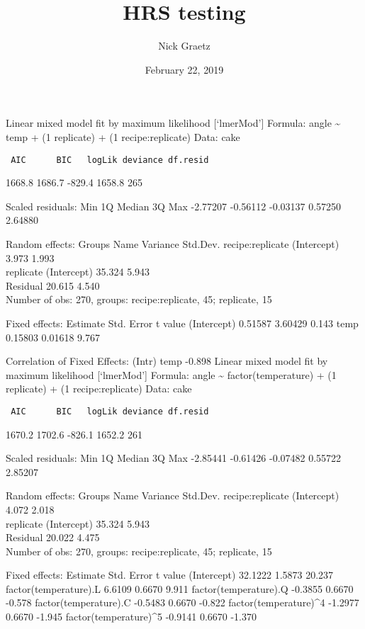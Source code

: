 \documentclass[]{article}
\title{HRS testing}
\author{Nick Graetz}
\date{February 22, 2019}
\begin{document}
\maketitle

\small
Linear mixed model fit by maximum likelihood {[}`lmerMod'{]} Formula:
angle \textasciitilde{} temp + (1 \textbar{} replicate) + (1 \textbar{}
recipe:replicate) Data: cake

\begin{verbatim}
 AIC      BIC   logLik deviance df.resid 
\end{verbatim}

1668.8 1686.7 -829.4 1658.8 265

Scaled residuals: Min 1Q Median 3Q Max -2.77207 -0.56112 -0.03137
0.57250 2.64880

Random effects: Groups Name Variance Std.Dev. recipe:replicate
(Intercept) 3.973 1.993\\
replicate (Intercept) 35.324 5.943\\
Residual 20.615 4.540\\
Number of obs: 270, groups: recipe:replicate, 45; replicate, 15

Fixed effects: Estimate Std. Error t value (Intercept) 0.51587 3.60429
0.143 temp 0.15803 0.01618 9.767

Correlation of Fixed Effects: (Intr) temp -0.898 Linear mixed model fit
by maximum likelihood {[}`lmerMod'{]} Formula: angle \textasciitilde{}
factor(temperature) + (1 \textbar{} replicate) + (1 \textbar{}
recipe:replicate) Data: cake

\begin{verbatim}
 AIC      BIC   logLik deviance df.resid 
\end{verbatim}

1670.2 1702.6 -826.1 1652.2 261

Scaled residuals: Min 1Q Median 3Q Max -2.85441 -0.61426 -0.07482
0.55722 2.85207

Random effects: Groups Name Variance Std.Dev. recipe:replicate
(Intercept) 4.072 2.018\\
replicate (Intercept) 35.324 5.943\\
Residual 20.022 4.475\\
Number of obs: 270, groups: recipe:replicate, 45; replicate, 15

Fixed effects: Estimate Std. Error t value (Intercept) 32.1222 1.5873
20.237 factor(temperature).L 6.6109 0.6670 9.911 factor(temperature).Q
-0.3855 0.6670 -0.578 factor(temperature).C -0.5483 0.6670 -0.822
factor(temperature)\^{}4 -1.2977 0.6670 -1.945 factor(temperature)\^{}5
-0.9141 0.6670 -1.370
\end{document}

